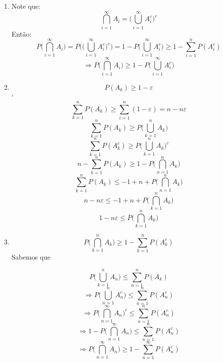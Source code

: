 \documentclass[a4paper,12pt]{report}
\begin{document}
		\begin{enumerate}[label=(\alph*)]
		\item
		Note que:
		$$\bigcap\limits_{i=1}^{\infty}A_i =\bigg(\bigcup\limits_{i=1}^{\infty}A_i^c\bigg)^c  $$
		Então:
				$$P\bigg(\bigcap\limits_{i=1}^{\infty}A_i\bigg) =P\bigg(\bigg(\bigcup\limits_{i=1}^{\infty}A_i^c\bigg)^c \bigg) 
				=
				1 - P\bigg(\bigcup\limits_{i=1}^{\infty}A_i^c\bigg)\ge 1- \sum\limits_{i=1}^{n} P(A_i^c)
				$$
				$$
				\Rightarrow P\bigg(\bigcap\limits_{i=1}^{\infty}A_i\bigg) \ge 1- P\bigg(\bigcup\limits_{i=1}^{\infty}A_i^c\bigg)
				$$
		
		\item 
		
		$$P(A_k)\ge 1-\varepsilon $$`
		$$\sum\limits_{k=1}^{n}P(A_k) \ge \sum\limits_{i=1}^{n}(1-\varepsilon)=n-n\varepsilon$$
		$$\sum\limits_{k=1}^{n} P(A_k)\ge P\bigg(\bigcup\limits_{k=1}^{n}A_k \bigg)  $$
			$$  \sum\limits_{k=1}^{n}P(A_k^c)\ge P\bigg(\bigcup\limits_{k=1}^{n}A_k \bigg)^c $$
		$$  n- \sum\limits_{k=1}^{n}P(A_k) \ge 1- P\bigg(\bigcap\limits_{n=1}^{n}A_k \bigg) $$
				$$  \sum\limits_{k=1}^{n}P(A_k) \le -1+n+ P\bigg(\bigcap\limits_{n=1}^{n}A_k\bigg) $$
								$$ n-n\varepsilon \le -1+n+ P\bigg(\bigcap\limits_{k=1}^{n}A_k \bigg) $$
									$$ 1-n\varepsilon \le P\bigg(\bigcap\limits_{k=1}^{n}A_k \bigg) $$
									\newpage
									\item 
									 
						 
						 $$P\bigg(\bigcap\limits_{k=1}^n A_k \bigg) \ge 1-\sum\limits_{k=1}^n P(A_k^c)$$
									Sabemos que 
									
									$$P\bigg(\bigcup\limits_{k=1}^{n}A_n \bigg) \le \sum\limits_{n=1}^{n}P(A_k)$$
									$$\Rightarrow P\bigg(\bigcup\limits_{n=1}^{n}A_n^c \bigg) \le \sum\limits_{n=1}^{n}P(A_n^c)$$
									$$\Rightarrow P\bigg(\bigcap\limits_{n=1}^{\infty}A_n \bigg)^c \le \sum\limits_{n=1}^{n}P(A_n^c) $$
									$$\Rightarrow 1-P\bigg(\bigcap\limits_{n=1}^{\infty}A_n \bigg) \le \sum\limits_{n=1}^{n}P(A_n^c)$$
								$$\Rightarrow P\bigg(\bigcap\limits_{n=1}^{\infty}A_n \bigg) \ge1- \sum\limits_{n=1}^{\infty}P(A_n^c)$$
		\end{enumerate}
		
		
\end{document}
